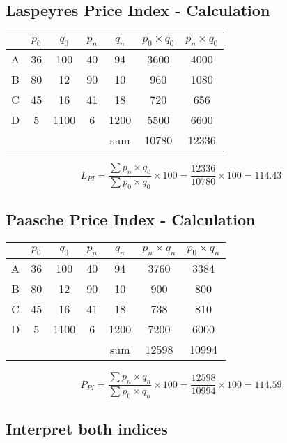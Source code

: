 \documentclass[a4paper,12pt]{article}
\begin{document}
\subsection*{Laspeyres Price Index - Calculation}
\begin{center}
	\begin{tabular}{|c|c|c|c|c|c|c|}
		\hline
		&	$p_0$	&	$q_0$	&	$p_n$	&	$q_n$	&	$p_0 \times q_0$	&	$p_n \times q_0$	\\	\hline
		A	&	36	&	100	&	40	&	94	&	3600	&	4000	\\	\hline
		B	&	80	&	12	&	90	&	10	&	960	&	1080	\\	\hline
		C	&	45	&	16	&	41	&	18	&	720	&	656	\\	\hline
		D	&	5	&	1100	&	6	&	1200	&	5500	&	6600	\\	\hline \hline
		&		&		&		& sum		&	10780	&	12336	\\	\hline
	\end{tabular} 
\end{center}

\[L_{PI} =  \frac{\sum  p_n \times q_0}{\sum  p_0 \times q_0} \times 100 = \frac{12336}{10780}\times 100 = 114.43\]

\subsection*{Paasche Price Index - Calculation}
\begin{center}
	\begin{tabular}{|c|c|c|c|c|c|c|}
		\hline
		&	$p_0$	&	$q_0$	&	$p_n$	&	$q_n$	&	$p_n \times q_n$	&	$p_0 \times q_n$	\\	\hline
		A	&	36	&	100	&	40	&	94	&	3760	&	3384	\\	\hline
		B	&	80	&	12	&	90	&	10	&	900	&	800	\\	\hline
		C	&	45	&	16	&	41	&	18	&	738	&	810	\\	\hline
		D	&	5	&	1100	&	6	&	1200	&	7200	&	6000	\\	\hline \hline
		&		&		&		& sum		&	12598	&	10994	\\	\hline
	\end{tabular} 
\end{center}

\[P_{PI} =  \frac{\sum  p_n \times q_n}{\sum  p_0 \times q_n} \times 100 = \frac{12598}{10994}\times 100 = 114.59\]




\subsection*{Interpret both indices}
\end{document}
